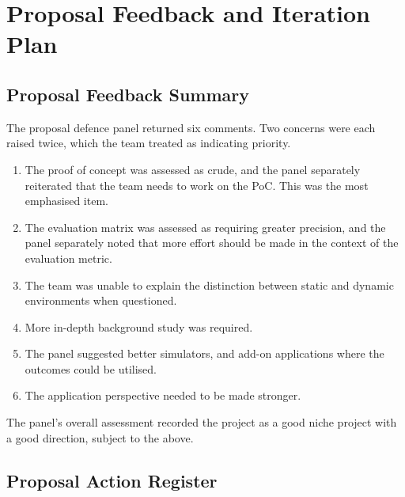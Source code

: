 \chapter{Proposal Feedback and Iteration Plan}

\section{Proposal Feedback Summary}
\label{sec:feedback-summary}

The proposal defence panel returned six comments. Two concerns were each raised
twice, which the team treated as indicating priority.

\begin{enumerate}
  \item The proof of concept was assessed as crude, and the panel separately
        reiterated that the team needs to work on the PoC. This was the most emphasised
        item.
  \item The evaluation matrix was assessed as requiring greater precision, and the
        panel separately noted that more effort should be made in the context of the
        evaluation metric.
  \item The team was unable to explain the distinction between static and dynamic
        environments when questioned.
  \item More in-depth background study was required.
  \item The panel suggested better simulators, and add-on applications where the
        outcomes could be utilised.
  \item The application perspective needed to be made stronger.
\end{enumerate}

The panel's overall assessment recorded the project as a good niche project with a
good direction, subject to the above.

\section{Proposal Action Register}
\label{sec:action-register}

